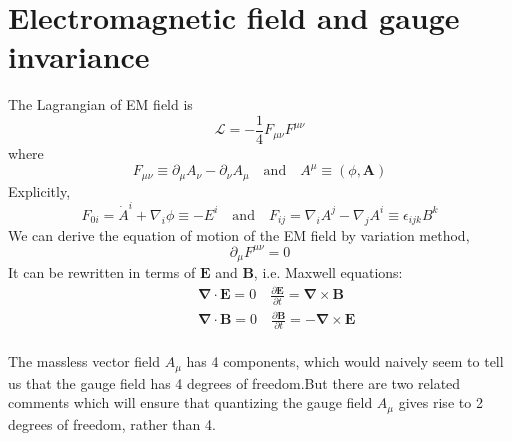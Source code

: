 \section{Electromagnetic field and gauge invariance}
\noindent
The Lagrangian of EM field is
\[\mathcal{L} = -\frac{1}{4}F_{\mu\nu}F^{\mu\nu}\]
where
\[F_{\mu\nu} \equiv \partial_{\mu} A_{\nu} - \partial_{\nu} A_{\mu} \quad \mbox{and} \quad A^{\mu} \equiv (\phi,\bm{A})\]
Explicitly,
\[F_{0i} = \dot{A}^i + \nabla_i \phi \equiv -E^i \quad \mbox{and} \quad F_{ij} = \nabla_i A^j - \nabla_j A^i \equiv \epsilon_{ijk}B^k\]
We can derive the equation of motion of the EM field by variation method,
\[\partial_{\mu}F^{\mu \nu} = 0\]
It can be rewritten in terms of $\bm{E}$ and $\bm{B}$, i.e. Maxwell equations:
\begin{eqnarray}
&\phantom{=}&\bm{\nabla} \cdot \bm{E} = 0 \quad \frac{\partial \bm{E}}{\partial t} = \bm{\nabla} \times \bm{B} \nonumber \\
&\phantom{=}& \bm{\nabla} \cdot \bm{B} = 0  \quad \frac{\partial \bm{B}}{\partial t} = - \bm{\nabla} \times \bm{E}\nonumber
\end{eqnarray}
\\
The massless vector field $A_{\mu}$ has 4 components, which would naively seem to tell us that the gauge field has 4 degrees of freedom.But there are two related comments which will ensure that quantizing the gauge field $A_{\mu}$ gives rise to 2 degrees of freedom, rather than 4.
